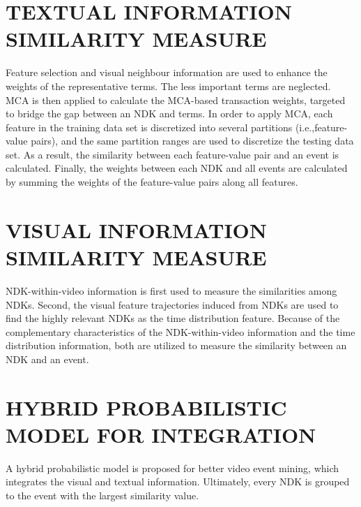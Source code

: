  \section{TEXTUAL INFORMATION SIMILARITY MEASURE}
 Feature selection and visual neighbour information are used to enhance the weights of the representative terms. The less important terms are neglected. MCA is then applied to calculate the MCA-based transaction weights, targeted to bridge the gap between an NDK and terms. In order to apply MCA, each feature in the training data set is discretized into several partitions (i.e.,feature-value pairs), and the same partition ranges are used to discretize the testing data set. As a result, the similarity between each feature-value pair and an event is calculated. Finally, the weights between each NDK and all events are calculated by summing the weights of the feature-value pairs along all features.
 
  \section{VISUAL INFORMATION SIMILARITY MEASURE}
  NDK-within-video information is ﬁrst used to measure the similarities among NDKs. Second, the visual feature trajectories induced from NDKs are used to ﬁnd the highly relevant NDKs as the time distribution feature. Because of the complementary characteristics of the NDK-within-video information and the time distribution information, both are utilized to measure the similarity between an NDK and an event.
  
 \section{HYBRID PROBABILISTIC MODEL FOR INTEGRATION}
 A hybrid probabilistic model is proposed for better video event mining, which integrates the visual and textual information. Ultimately, every NDK is grouped to the event with the largest similarity value.
